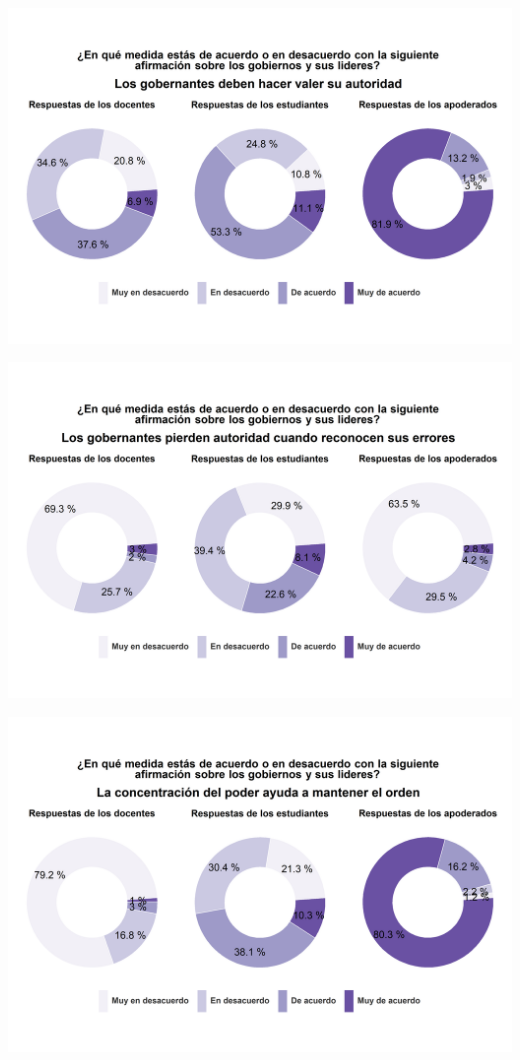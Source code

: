 \documentclass[
  14pt,
]{book}
\begin{document}
\begin{center}\includegraphics[width=52.49in]{images/graph_aut5} \end{center}

\begin{center}\includegraphics[width=52.49in]{images/graph_aut6} \end{center}

\begin{center}\includegraphics[width=52.49in]{images/graph_aut7} \end{center}
\end{document}
